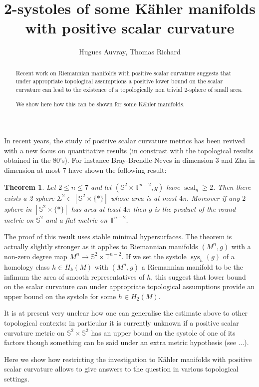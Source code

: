\documentclass{amsart}
\title{2-systoles of some K\"ahler manifolds with positive scalar curvature}
\author{Hugues Auvray, Thomas Richard}
\date{}
\newtheorem{theorem}{Theorem}[section]
\numberwithin{equation}{section}
\theoremstyle{definition}
\DeclareMathOperator{\scal}{scal}
\DeclareMathOperator{\sys}{sys}
\begin{document}
\maketitle
\begin{abstract}
    Recent work on Riemannian manifolds with positive scalar curvature suggests that under appropriate topological assumptions a positive lower bound on the scalar curvature can lead to the existence of a topologically non trivial 2-sphere of small area.

    We show here how this can be shown for some K\"ahler manifolds.
\end{abstract}

In recent years, the study of positive scalar curvature metrics has been revived with a new focus on quantitative results (in constrast with the topological results obtained in the 80's). For instance Bray-Brendle-Neves in dimension 3 and Zhu in dimension at most 7 have shown the following result:

\begin{theorem}
    Let $2\leq n\leq 7$ and let $(\mathbb{S}^2\times\mathbb{T}^{n-2},g)$ have $\scal_g\geq 2$. Then there exists a 2-sphere $\Sigma^2\in [\mathbb{S}^2\times\{\ast\}]$ whose area is at most $4\pi$. Moreover if any $2$-sphere in $[\mathbb{S}^2\times\{\ast\}]$ has area at least $4\pi$ then $g$ is the product of the round metric on $\mathbb{S}^2$ and a flat metric on $\mathbb{T}^{n-2}$.
\end{theorem}

The proof of this result uses stable minimal hypersurfaces. The theorem is actually slightly stronger as it applies to Riemannian manifolds $(M^n,g)$ with a non-zero degree map $M^n\to \mathbb{S}^2\times\mathbb{T}^{n-2}$. If we set the systole $\sys_h(g)$ of a homology class $h\in H_k(M)$ with $(M^n,g)$ a Riemannian manifold to be the infimum the area of smooth representatives of $h$, this suggest that lower bound on the scalar curvature can under appropriate topological assumptions provide an upper bound on the systole for some $h\in H_2(M)$.

It is at present very unclear how one can generalise the estimate above to other topological contexts: in particular it is currently unknown if a positive scalar curvature metric on $\mathbb{S}^2\times\mathbb{S}^2$ has an upper bound on the systole of one of its factors though something can be said under an extra metric hypothesis (see ...).

Here we show how restricting the investigation to K\"ahler manifolds with positive scalar curvature allows to give answers to the question in various topological settings.
\end{document}
